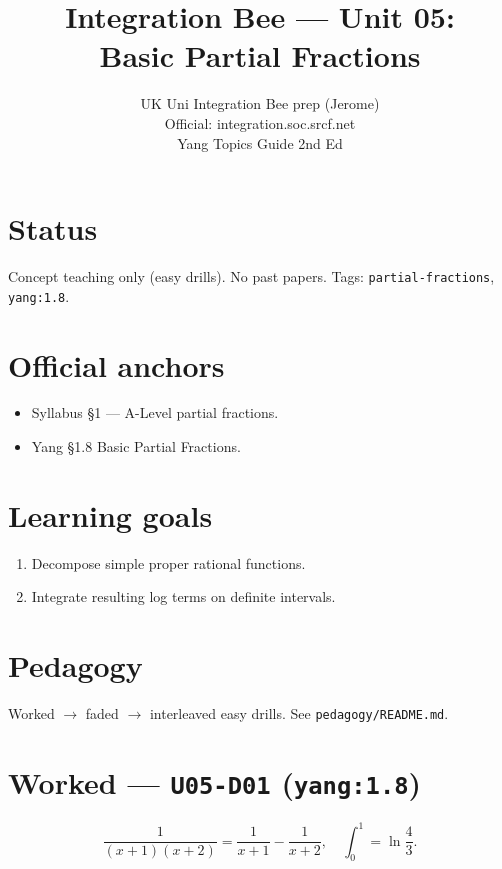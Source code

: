 
\title{Integration Bee --- Unit 05:\\ Basic Partial Fractions}
\author{UK Uni Integration Bee prep (Jerome)\\ Official: integration.soc.srcf.net\\ Yang Topics Guide 2nd Ed}
\date{}

\maketitle

\section*{Status}
Concept teaching only (easy drills). No past papers.
Tags: \texttt{partial-fractions}, \texttt{yang:1.8}.

\section{Official anchors}
\begin{itemize}
  \item Syllabus §1 --- A-Level partial fractions.
  \item Yang §1.8 Basic Partial Fractions.
\end{itemize}

\section{Learning goals}
\begin{enumerate}
  \item Decompose simple proper rational functions.
  \item Integrate resulting log terms on definite intervals.
\end{enumerate}

\section{Pedagogy}
Worked $\to$ faded $\to$ interleaved easy drills. See \texttt{pedagogy/README.md}.


\section{Worked --- \texttt{U05-D01} (\texttt{yang:1.8})}
\[
\frac{1}{(x+1)(x+2)}=\frac{1}{x+1}-\frac{1}{x+2},\quad
\int_0^1=\ln\frac43.
\]

